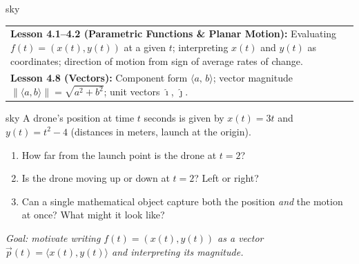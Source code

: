 \documentclass[10pt]{article}
\begin{document}
\begin{skillbox}{sky}
\begin{tabularx}{\linewidth}{@{}X@{}}
\textbf{Lesson 4.1--4.2 (Parametric Functions \& Planar Motion):}
Evaluating $f(t)=(x(t),y(t))$ at a given $t$; interpreting $x(t)$ and $y(t)$
as coordinates; direction of motion from sign of average rates of change.\\[3pt]
\textbf{Lesson 4.8 (Vectors):}
Component form $\langle a,\,b\rangle$; vector magnitude
$\|\langle a,b\rangle\|=\sqrt{a^2+b^2}$; unit vectors $\hat{\imath}$, $\hat{\jmath}$.
\end{tabularx}
\end{skillbox}

\begin{skillbox}[Hook]{sky}
A drone's position at time $t$ seconds is given by $x(t)=3t$ and $y(t)=t^{2}-4$
(distances in meters, launch at the origin).
\begin{enumerate}
  \item How far from the launch point is the drone at $t=2$?
  \item Is the drone moving up or down at $t=2$?  Left or right?
  \item Can a single mathematical object capture both the position \emph{and} the
        motion at once?  What might it look like?
\end{enumerate}
\textit{Goal: motivate writing $f(t)=(x(t),y(t))$ as a vector
$\vec{p}(t)=\langle x(t),y(t)\rangle$ and interpreting its magnitude.}
\end{skillbox}
\end{document}

